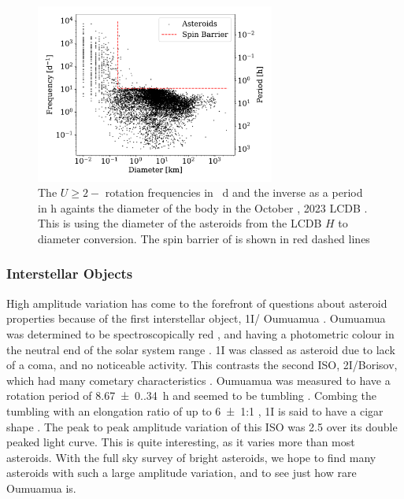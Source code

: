 \documentclass{UCreport}
\DeclareRobustCommand{\okina}{%
  \raisebox{\dimexpr\fontcharht\font`A-\height}{%
    \scalebox{0.8}{`}%
  }%
}
\newcommand{\omuamua}{\okina Oumuamua }
\begin{document}
\begin{figure}[t!]
  \centering
  \includegraphics[width=0.7\textwidth]{../Test Code/Testing Figures/Diam-FreqPlot.pdf}
  \caption[Asteroid frequencies vs diameter (LCDB)]{The $U\geq 2-$ rotation frequencies in \unit{\per\day} and the inverse as a period in \unit{\hour} againts the diameter of the body in the October , 2023 LCDB \citet{Warner2009}.
    This is using the diameter of the asteroids from the LCDB $H$ to diameter conversion. The spin barrier of \citet{Pravec2000} is shown in red dashed lines}
  \label{Fig:FreqVsDiam}
\end{figure}

\subsubsection*{Interstellar Objects}
High amplitude variation has come to the forefront of questions about asteroid properties because of the first interstellar object, 1I/\omuamua \citep[see][for a review]{Bannister2019}.
\omuamua was determined to be spectroscopically red \citep{Fitzsimmons2017, Meech2017}, and having a photometric colour in the neutral end of the solar system range \citep{Bannister2017}.
1I was classed as asteroid due to lack of a coma, and no noticeable activity.
This contrasts the second ISO, 2I/Borisov, which had many cometary characteristics \citep[see ][for a review]{Dorofeeva2023}. %
\omuamua was measured to have a rotation period of \qty{8.67(0.34)}{\hour} \citep{Belton2018} and seemed to be tumbling \citep[e.g.][]{Drahus2018,Fraser2018}.
Combing the tumbling with an elongation ratio of up to \qty{6(1)}{}:1 \citep{McNeill2018}, 1I is said to have a cigar shape \citep{Belton2018}.
The peak to peak amplitude variation of this ISO was \qty{2.5}{\mag} \citep{Meech2017} over its double peaked light curve.
This is quite interesting, as it varies more than most asteroids.
With the full sky survey of bright asteroids, we hope to find many asteroids with such a large amplitude variation, and to see just how rare \omuamua is.
\end{document}
